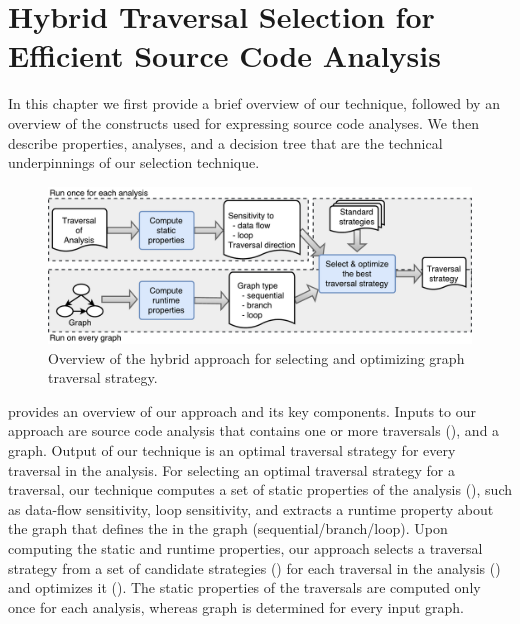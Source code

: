 \chapter{Hybrid Traversal Selection for Efficient Source Code Analysis}
\label{sec:approach}
\label{sec:overview}
 
In this chapter we first provide a brief overview of our technique, 
followed by an overview of the constructs used for expressing source code analyses.
We then describe properties, analyses, and a decision tree that are 
the technical underpinnings of our selection technique.

\begin{figure}[ht!]
  \centering \includegraphics[width=0.9\linewidth]{figures/hybrid-overview.pdf}
\caption{Overview of the hybrid approach for selecting and optimizing graph traversal strategy.}
  \label{fig:overview}
\end{figure}

 provides an overview of our approach and its key components.
Inputs to our approach are source code analysis that contains one or more 
traversals (), and a graph. 
Output of our technique is an optimal traversal strategy for every
traversal in the analysis. For selecting an optimal traversal strategy for a
traversal, our technique computes a set of static properties of 
the analysis (),
such as data-flow sensitivity, loop sensitivity, and extracts a runtime property
about the graph that defines the \graphprop{} in the graph
(sequential/branch/loop). Upon computing the static and runtime properties, our
approach selects a traversal strategy from a set of candidate strategies () for
each traversal in the analysis () and 
optimizes it (). The static properties of the
traversals are computed only once for each analysis, whereas graph \graphprop{} 
is determined for every input graph.



